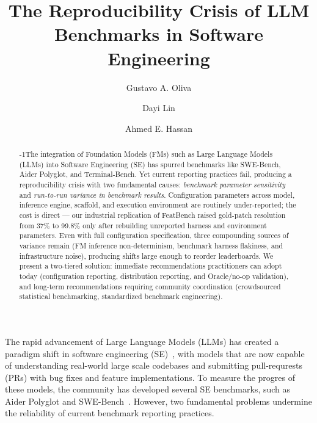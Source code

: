 \documentclass{IEEEcsmag}
\begin{document}

\title{The Reproducibility Crisis of LLM Benchmarks in Software Engineering}

\author{Gustavo A. Oliva}

\author{Dayi Lin}

\author{Ahmed E. Hassan}


\begin{abstract}\looseness-1The integration of Foundation Models (FMs) such as Large Language Models (LLMs) into Software Engineering (SE) has spurred benchmarks like SWE-Bench, Aider Polyglot, and Terminal-Bench. Yet current reporting practices fail, producing a reproducibility crisis with two fundamental causes: \textit{benchmark parameter sensitivity} and \textit{run-to-run variance in benchmark results}. Configuration parameters across model, inference engine, scaffold, and execution environment are routinely under-reported; the cost is direct — our industrial replication of FeatBench raised gold-patch resolution from 37\% to 99.8\% only after rebuilding unreported harness and environment parameters. Even with full configuration specification, three compounding sources of variance remain (FM inference non-determinism, benchmark harness flakiness, and infrastructure noise), producing shifts large enough to reorder leaderboards. We present a two-tiered solution: immediate recommendations practitioners can adopt today (configuration reporting, distribution reporting, and Oracle/no-op validation), and long-term recommendations requiring community coordination (crowdsourced statistical benchmarking, standardized benchmark engineering).
\end{abstract}

\maketitle

The rapid advancement of Large Language Models (LLMs) has created a paradigm shift in software engineering (SE)~\cite{hassan2026se3,hassan2025agenticse}, with models that are now capable of understanding real-world large scale codebases and submitting pull-requrests (PRs) with bug fixes and feature implementations. To measure the progres of these models, the community has developed several SE benchmarks, such as  Aider Polyglot and SWE-Bench~\cite{jimenez2024swebench}. However, two fundamental problems undermine the reliability of current benchmark reporting practices.
\end{document}
